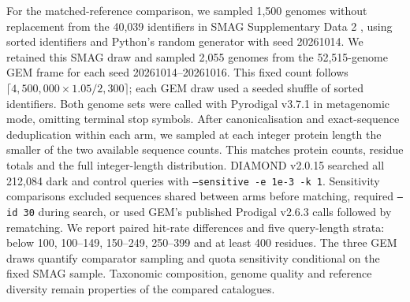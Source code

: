 For the matched-reference comparison, we sampled 1{,}500 genomes without replacement from the
40{,}039 identifiers in SMAG Supplementary Data 2 \citep{ma2023smag}, using sorted identifiers
and Python's random generator with seed 20261014. We retained this SMAG draw and sampled
2{,}055 genomes from the 52{,}515-genome GEM frame for each seed 20261014--20261016.
This fixed count follows $\lceil4{,}500{,}000\times1.05/2{,}300\rceil$; each GEM draw used a
seeded shuffle of sorted identifiers. Both genome sets were called with Pyrodigal v3.7.1
\citep{larralde2022pyrodigal} in metagenomic mode, omitting terminal stop symbols. After
canonicalisation and exact-sequence deduplication within each arm, we sampled at each integer
protein length the smaller of the two available sequence counts. This matches protein counts,
residue totals and the full integer-length distribution. DIAMOND v2.0.15 searched all
212{,}084 dark and control queries with \texttt{--sensitive -e 1e-3 -k 1}.
Sensitivity comparisons excluded sequences shared between arms before matching, required
\texttt{--id 30} during search, or used GEM's published Prodigal v2.6.3 calls followed by
rematching. We report paired hit-rate differences and five query-length strata: below 100,
100--149, 150--249, 250--399 and at least 400 residues. The three GEM draws quantify comparator
sampling and quota sensitivity conditional on the fixed SMAG sample. Taxonomic composition,
genome quality and reference diversity remain properties of the compared catalogues.
